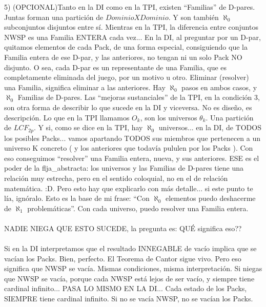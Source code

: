 	5) (OPCIONAL)Tanto en la DI como en la TPI, existen ``Familias'' de D-pares. Juntas forman una partición de $Dominio X Dominio$. Y son también $\aleph_{0}$ subconjuntos disjuntos entre sí. Mientras en la TPI, la diferencia entre conjuntos NWSP es una Familia ENTERA cada vez... En la DI, al preguntar por un D-par, quitamos elementos de cada Pack, de una forma especial, consiguiendo que la Familia entera de ese D-par, y las anteriores, no tengan ni un solo Pack NO disjunto. O sea, cada D-par es un representante de una Familia, que es completamente eliminada del juego, por un motivo u otro. Eliminar (resolver) una Familia, significa eliminar a las anteriores. Hay $\aleph_{0}$ pasos en ambos casos, y $\aleph_{0}$ Familias de D-pares. Las ``mejoras sustanciales'' de la TPI, en la condición 3, son otra forma de describir lo que sucede en la DI y viceversa. No es diseño, es descripción. Lo que en la TPI llamamos $O_{k}$, son los universos $\theta_{k}$. Una partición de $LCF_{2p}$. Y si, como se dice en la TPI, hay $\aleph_{0}$ universos... en la DI, de TODOS los posibles Packs... vamos apartando TODOS sus miembros que pertenecen a un universo K concreto ( y los anteriores que todavía pululen por los Packs ). Con eso conseguimos ``resolver'' una Familia entera, nueva, y sus anteriores. ESE es el poder de la flja\_abstracta: los universos y las Familias de D-pares tiene una relación muy estrecha, pero en el sentido coloquial, no en el de relación matemática. :D. Pero esto hay que explicarlo con más detalle... si este punto te lía, ignóralo. Esto es la base de mi frase: ``Con $\aleph_{0}$ elementos puedo deshacerme de $\aleph_{1}$ problemáticas''. Con cada universo, puedo resolver una Familia entera.
	\\\\
	
	\noindent
	NADIE NIEGA QUE ESTO SUCEDE, la pregunta es: QUÉ significa eso??
	\\\\
	
	\noindent
	Si en la DI interpretamos que el resultado INNEGABLE de vacío implica que se vacían los Packs. Bien, perfecto. El Teorema de Cantor sigue vivo. Pero eso significa que NWSP se vacía. Mismas condiciones, misma interpretación. Si niegas que NWSP se vacía, porque cada NWSP está lejos de ser vacío, y siempre tiene cardinal infinito... PASA LO MISMO EN LA DI... Cada estado de los Packs, SIEMPRE tiene cardinal infinito. Si no se vacía NWSP, no se vacían los Packs.
	\\\\
	
